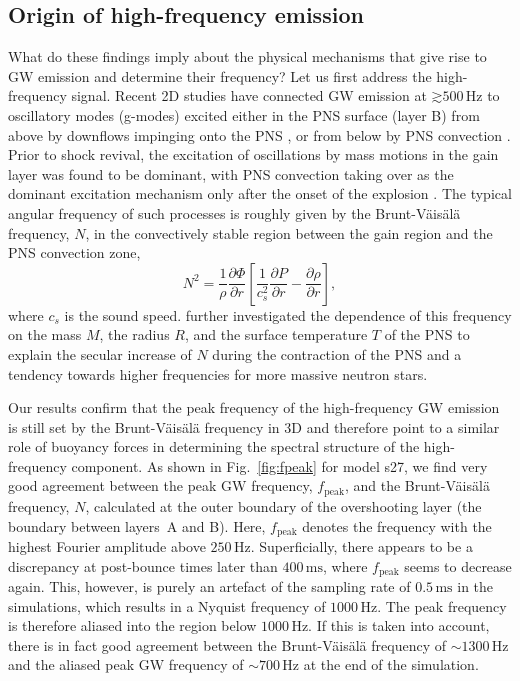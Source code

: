 \subsection{Origin of high-frequency emission}
What do these findings imply about the physical mechanisms that give
rise to GW emission and determine their frequency? Let us first
address the high-frequency signal. Recent 2D studies have connected GW
emission at $\mathord{\gtrsim} 500 \, \mathrm{Hz}$ to oscillatory modes
(g-modes) excited either in the PNS surface (layer B) from above by
downflows impinging onto the PNS
\citep{marek_08,murphy_09,mueller_13}, or from below by PNS
convection \citep{marek_08,mueller_e_12,mueller_13}. Prior to shock
revival, the excitation of oscillations by mass motions in the gain layer was found
to be dominant, with PNS convection taking over as the dominant
excitation mechanism only after the onset of the explosion \citep{mueller_e_12,mueller_13}.
The typical angular frequency of such
processes is roughly given by the Brunt-V\"{a}is\"{a}l\"{a} frequency, $N$,
in the convectively stable region between the gain region and the PNS convection zone,
\begin{equation} \label{eq:BV}
N^2 = \frac{1}{\rho} \frac{\partial \Phi}{\partial r} \left [ \frac{1}{c_s^2} \frac{\partial P}{\partial r} - \frac{\partial \rho}{\partial r} \right ],
\end{equation}
where $c_s$ is the sound speed. \citet{mueller_13} further investigated the dependence
of this frequency on the mass $M$, the radius $R$, and the surface temperature $T$ of the PNS to explain the secular
increase of $N$ during the contraction of the PNS and
a tendency towards higher frequencies for more massive neutron stars.

Our results confirm that the peak frequency of the high-frequency GW emission
is still set by the Brunt-V\"{a}is\"{a}l\"{a} frequency in 3D and therefore point to a
similar role of buoyancy forces in determining the spectral structure
of the high-frequency component. As shown in Fig.~\ref{fig:fpeak} for
model s27, we find very good agreement between the peak GW
frequency, $f_\mathrm{peak}$, and the Brunt-V\"{a}is\"{a}l\"{a}
frequency, $N$, calculated at the outer boundary of the overshooting
layer (the boundary between layers~A and B).
Here, $f_\mathrm{peak}$ denotes the frequency with the highest Fourier amplitude above $250 \, \mathrm{Hz}$.
Superficially, there appears to be a discrepancy at post-bounce times
later than $400 \, \mathrm{ms}$, where $f_\mathrm{peak}$ seems to decrease
again. This, however, is purely an artefact of the
sampling rate of $0.5 \, \mathrm{ms}$ in the simulations, which results
in a Nyquist frequency of $1000 \, \mathrm{Hz}$. The peak frequency is
therefore aliased into the region below $1000 \, \mathrm{Hz}$. If
this is taken into account, there is in fact good agreement between
the Brunt-V\"{a}is\"{a}l\"{a} frequency of $\mathord{\sim} 1300
\, \mathrm{Hz}$ and the aliased peak GW frequency of 
$\mathord{\sim} 700\, \mathrm{Hz}$ at the end of the simulation.

